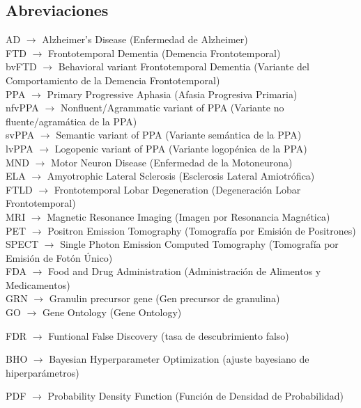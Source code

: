 \documentclass{bmcart}
\begin{document}
	\begin{backmatter}
	
		\section*{Abreviaciones}%
			AD $\rightarrow$ Alzheimer’s Disease (Enfermedad de Alzheimer)\\
			FTD $\rightarrow$ Frontotemporal Dementia (Demencia Frontotemporal)\\
			bvFTD $\rightarrow$ Behavioral variant Frontotemporal Dementia (Variante del Comportamiento de la Demencia Frontotemporal)\\
			PPA $\rightarrow$ Primary Progressive Aphasia (Afasia Progresiva Primaria)\\
			nfvPPA $\rightarrow$ Nonfluent/Agrammatic variant of PPA (Variante no fluente/agramática de la PPA)\\
			svPPA $\rightarrow$ Semantic variant of PPA (Variante semántica de la PPA)\\
			lvPPA $\rightarrow$ Logopenic variant of PPA (Variante logopénica de la PPA)\\
			MND $\rightarrow$ Motor Neuron Disease (Enfermedad de la Motoneurona)\\
			ELA $\rightarrow$ Amyotrophic Lateral Sclerosis (Esclerosis Lateral Amiotrófica)\\
			FTLD $\rightarrow$ Frontotemporal Lobar Degeneration (Degeneración Lobar Frontotemporal)\\
			MRI $\rightarrow$ Magnetic Resonance Imaging (Imagen por Resonancia Magnética)\\
			PET $\rightarrow$ Positron Emission Tomography (Tomografía por Emisión de Positrones)\\
			SPECT $\rightarrow$ Single Photon Emission Computed Tomography (Tomografía por Emisión de Fotón Único)\\
			FDA $\rightarrow$ Food and Drug Administration (Administración de Alimentos y Medicamentos)\\
			GRN $\rightarrow$ Granulin precursor gene (Gen precursor de granulina)\\
			GO $\rightarrow$ Gene Ontology (Gene Ontology)

			
			FDR $\rightarrow$ Funtional False Discovery (tasa de descubrimiento falso)
			
			BHO $\rightarrow$ Bayesian Hyperparameter Optimization (ajuste bayesiano de hiperparámetros)	
			
			PDF $\rightarrow$ Probability Density Function (Función de Densidad de Probabilidad)
			

\end{backmatter}
\end{document}
